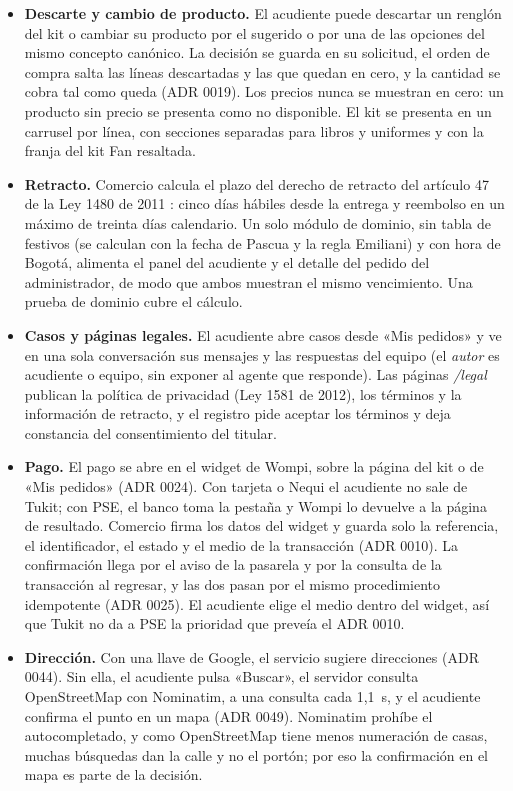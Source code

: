 \begin{itemize}
\item \textbf{Descarte y cambio de producto.} El acudiente puede descartar un renglón del kit o
cambiar su producto por el sugerido o por una de las opciones del mismo concepto canónico. La
decisión se guarda en su solicitud, el orden de compra salta las líneas descartadas y las que
quedan en cero, y la cantidad se cobra tal como queda (ADR 0019). Los precios nunca se muestran en
cero: un producto sin precio se presenta como no disponible. El kit se presenta en un carrusel por
línea, con secciones separadas para libros y uniformes y con la franja del kit Fan resaltada.
\item \textbf{Retracto.} Comercio calcula el plazo del derecho de retracto del artículo 47 de la
Ley 1480 de 2011 \citep{congreso_ley1480_2011}: cinco días hábiles desde la entrega y reembolso en
un máximo de treinta días calendario. Un solo módulo de dominio, sin tabla de festivos (se calculan
con la fecha de Pascua y la regla Emiliani) y con hora de Bogotá, alimenta el panel del acudiente y
el detalle del pedido del administrador, de modo que ambos muestran el mismo vencimiento. Una
prueba de dominio cubre el cálculo.
\item \textbf{Casos y páginas legales.} El acudiente abre casos desde «Mis pedidos» y ve en una
sola conversación sus mensajes y las respuestas del equipo (el \emph{autor} es acudiente o equipo,
sin exponer al agente que responde). Las páginas \emph{/legal} publican la política de privacidad
(Ley 1581 de 2012), los términos y la información de retracto, y el registro pide aceptar los
términos y deja constancia del consentimiento del titular.
\item \textbf{Pago.} El pago se abre en el widget de Wompi, sobre la página del kit o de «Mis
pedidos» (ADR 0024). Con tarjeta o Nequi el acudiente no sale de Tukit; con PSE, el banco toma la
pestaña y Wompi lo devuelve a la página de resultado. Comercio firma los datos del widget y guarda
solo la referencia, el identificador, el estado y el medio de la transacción (ADR 0010). La
confirmación llega por el aviso de la pasarela y por la consulta de la transacción al regresar, y
las dos pasan por el mismo procedimiento idempotente (ADR 0025). El acudiente elige el medio dentro
del widget, así que Tukit no da a PSE la prioridad que preveía el ADR 0010.
\item \textbf{Dirección.} Con una llave de Google, el servicio sugiere direcciones (ADR 0044).
Sin ella, el acudiente pulsa «Buscar», el servidor consulta OpenStreetMap con Nominatim, a una
consulta cada 1,1~s, y el acudiente confirma el punto en un mapa (ADR 0049). Nominatim prohíbe el
autocompletado, y como OpenStreetMap tiene menos numeración de casas, muchas búsquedas dan la calle
y no el portón; por eso la confirmación en el mapa es parte de la decisión.
\end{itemize}

